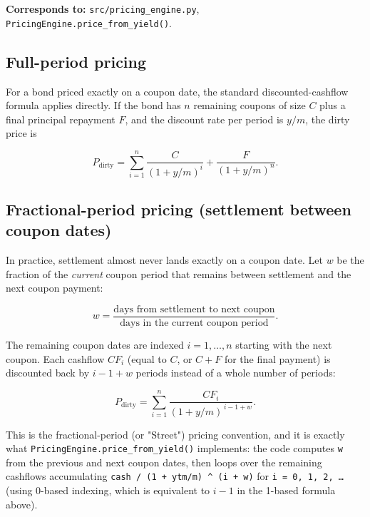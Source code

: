 \documentclass[11pt]{article}
\begin{document}
\textbf{Corresponds to:} \texttt{src/pricing\_engine.py}, \texttt{PricingEngine.price\_from\_yield()}.

\subsection{Full-period pricing}

For a bond priced exactly on a coupon date, the standard discounted-cashflow formula applies
directly. If the bond has $n$ remaining coupons of size $C$ plus a final principal repayment
$F$, and the discount rate per period is $y/m$, the dirty price is

\begin{equation}
  P_{\text{dirty}} = \sum_{i=1}^{n} \frac{C}{(1+y/m)^i} + \frac{F}{(1+y/m)^n}.
  \label{eq:full-period}
\end{equation}

\subsection{Fractional-period pricing (settlement between coupon dates)}

In practice, settlement almost never lands exactly on a coupon date. Let $w$ be the fraction
of the \emph{current} coupon period that remains between settlement and the next coupon
payment:

\begin{equation}
  w = \frac{\text{days from settlement to next coupon}}{\text{days in the current coupon period}}.
\end{equation}

The remaining coupon dates are indexed $i = 1, \dots, n$ starting with the next coupon. Each
cashflow $CF_i$ (equal to $C$, or $C+F$ for the final payment) is discounted back by
$i - 1 + w$ periods instead of a whole number of periods:

\begin{equation}
  P_{\text{dirty}} = \sum_{i=1}^{n} \frac{CF_i}{(1+y/m)^{\,i-1+w}}.
  \label{eq:fractional-period}
\end{equation}

This is the fractional-period (or "Street") pricing convention, and it is exactly what
\texttt{PricingEngine.price\_from\_yield()} implements: the code computes \texttt{w} from
the previous and next coupon dates, then loops over the remaining cashflows accumulating
\texttt{cash / (1 + ytm/m) \textasciicircum{} (i + w)} for \texttt{i = 0, 1, 2, \dots} (using
0-based indexing, which is equivalent to $i - 1$ in the 1-based formula above).
\end{document}
